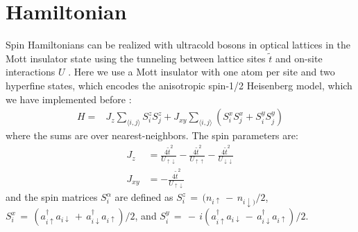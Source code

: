 \documentclass[12pt]{iopart}
\begin{document}
%
%
%
%
%

\appendix{}
\section{Hamiltonian}\label{appA}
Spin Hamiltonians can be realized with ultracold bosons in optical lattices in the Mott insulator state using the tunneling between lattice sites $\tilde{t}$ and on-site interactions $U$ \cite{altman03}. Here we use a Mott insulator with one atom per site and two hyperfine states, which encodes the anisotropic spin-1/2 Heisenberg model, which we have implemented before \cite{ivana20, nature20}:
\begin{eqnarray}
H = & J_z \sum_{\langle i,j \rangle} S_i^zS_j^z+ J_{xy} \sum_{\langle i,j \rangle}  \left(S_i^xS_j^x + S_i^yS_j^y \right) \nonumber
\label{Heisenberg_supp}
\end{eqnarray}
where the sums are over nearest-neighbors. The spin parameters are:
\begin{eqnarray}
J_z& = \frac{4\tilde{t}^2}{U_{\uparrow\downarrow}} - \frac{4\tilde{t}^2}{U_{\uparrow\uparrow}} -\frac{4\tilde{t}^2}{U_{\downarrow\downarrow}} \nonumber \\
J_{xy}&=-\frac{4\tilde{t}^2}{U_{\uparrow\downarrow}} 
\end{eqnarray}
and the spin matrices $S^{\alpha}_i$ are defined as $S^z_i\,{=}\,(n_{i\uparrow}\,{-}\,n_{i\downarrow)}/2$, $S^x_i\,{=}\,(a^{\dagger}_{i\uparrow}a_{i\downarrow}\,{+}\,a^{\dagger}_{i\downarrow}a_{i\uparrow})/2$, and $S^y_i\,{=}\,{-}\,i( a^{\dagger}_{i\uparrow}a_{i\downarrow}\,{-}\,a^{\dagger}_{i\downarrow}a_{i\uparrow})/2$.
\end{document}
